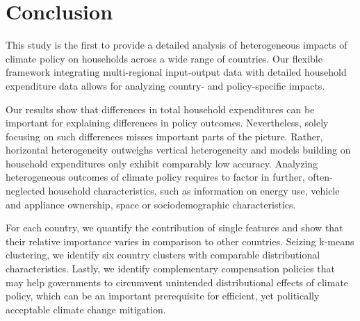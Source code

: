 \documentclass[12pt, a4paper]{article}
\begin{document}
\section{Conclusion} \label{sec:conclusion}

This study is the first to provide a detailed analysis of heterogeneous impacts of climate policy on households across a wide range of countries. Our flexible framework integrating multi-regional input-output data with detailed household expenditure data allows for analyzing country- and policy-specific impacts.

Our results show that differences in total household expenditures can be important for explaining differences in policy outcomes. Nevertheless, solely focusing on such differences misses important parts of the picture. Rather, horizontal heterogeneity outweighs vertical heterogeneity and models building on household expenditures only exhibit comparably low accuracy. Analyzing heterogeneous outcomes of climate policy requires to factor in further, often-neglected household characteristics, such as information on energy use, vehicle and appliance ownership, space or sociodemographic characteristics.

For each country, we quantify the contribution of single features and show that their relative importance varies in comparison to other countries. Seizing k-means clustering, we identify six country clusters with comparable distributional characteristics. %
Lastly, we identify complementary compensation policies that may help governments to circumvent unintended distributional effects of climate policy, which can be an important prerequisite for efficient, yet politically acceptable climate change mitigation. 

\clearpage

\begin{refcontext}[sorting=nyt]
\printbibliography
\end{refcontext}

\clearpage
\end{document}
